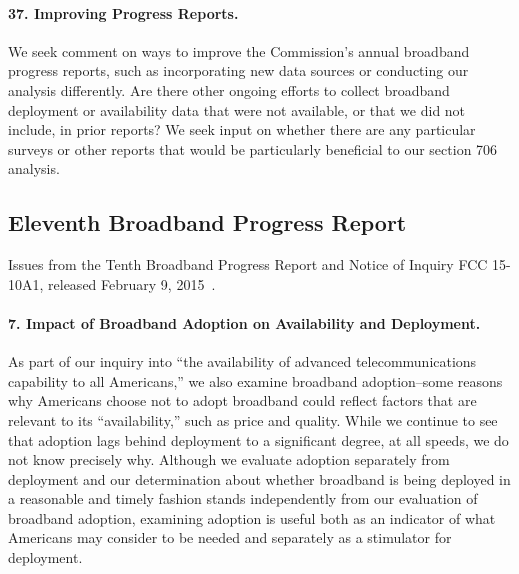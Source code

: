 \paragraph{37. Improving Progress Reports. } We seek comment on ways to improve the Commission’s
annual broadband progress reports, such as incorporating new data sources or conducting our
analysis differently. Are there other ongoing efforts to collect broadband deployment or
availability data that were not available, or that we did not include, in prior reports? 
We seek input on whether there are any particular surveys or other reports that would be
particularly beneficial to our section 706 analysis.


\subsection{Eleventh Broadband Progress Report}
\label{subsec:fcc2015}

Issues from the Tenth Broadband Progress Report and Notice of Inquiry FCC 15-10A1,
released February 9, 2015~\cite{fcc2015progress-report}.

\paragraph{7. Impact of Broadband Adoption on Availability and Deployment.}
As part of our inquiry
into ``the availability of advanced telecommunications capability to all Americans,''
we also examine broadband adoption--some reasons why Americans choose not to adopt
broadband could reflect factors that are relevant to its ``availability,'' such as
price and quality. While we continue to see that adoption lags behind deployment
to a significant degree, at all speeds, we do not know precisely why.
Although we evaluate adoption separately from deployment and our determination
about whether broadband is being deployed in a reasonable and timely fashion stands
independently from our evaluation of broadband adoption, examining adoption is useful
both as an indicator of what Americans may consider to be needed and separately as
a stimulator for deployment.

